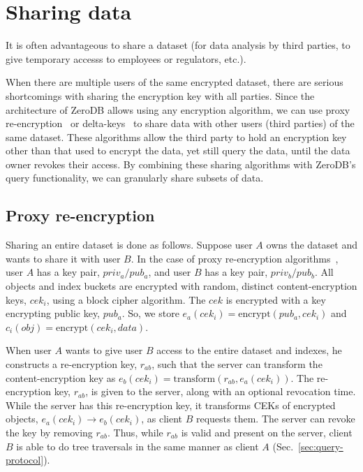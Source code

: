 \documentclass[notitlepage,longbibliography]{revtex4-1}
\begin{document}
\section{Sharing data}

It is often advantageous to share a dataset (for data analysis by third parties,
to give temporary accesss to employees or regulators, etc.).

When there are multiple users of the same encrypted dataset, there are serious shortcomings with sharing the encryption key with all parties.
Since the architecture of ZeroDB allows using any encryption algorithm, we can use proxy re-encryption~\cite{afgh,libert2011unidirectional}
or delta-keys~\cite{delta-keys,mylar} to share data with other users (third parties) of the same dataset.
These algorithms allow the third party to hold an encryption key other than that used to encrypt the data,
yet still query the data, until the data owner revokes their access.
By combining these sharing algorithms with ZeroDB's query functionality, we can granularly share subsets of data. 

\subsection{Proxy re-encryption}

Sharing an entire dataset is done as follows.
Suppose user $A$ owns the dataset and wants to share it with user $B$.
In the case of proxy re-encryption algorithms~\cite{afgh,libert2011unidirectional}, user $A$ has a key pair, $priv_a/pub_a$, and user $B$ has a key pair, $priv_b/pub_b$.
All objects and index buckets are encrypted with random, distinct content-encryption keys, $cek_i$, using a block cipher algorithm.
The $cek$ is encrypted with a key encrypting public key, $pub_a$.
So, we store $e_a(cek_i) = \mbox{encrypt}(pub_a, cek_i)$ and $c_i(obj) = \mbox{encrypt}(cek_i, data)$.

When user $A$ wants to give user $B$ access to the entire dataset and indexes, he constructs a re-encryption key, $r_{ab}$, such that
the server can transform the content-encryption key as $e_b(cek_i) = \mbox{transform}(r_{ab}, e_a(cek_i))$.
The re-encryption key, $r_{ab}$, is given to the server, along with an optional revocation time.
While the server has this re-encryption key, it transforms CEKs of encrypted objects, $e_a(cek_i) \rightarrow e_b(cek_i)$, as client $B$ requests them.
The server can revoke the key by removing $r_{ab}$.
Thus, while $r_{ab}$ is valid and present on the server, client $B$ is able to do tree traversals in the same manner as client $A$ (Sec.~\ref{sec:query-protocol}).
\end{document}
